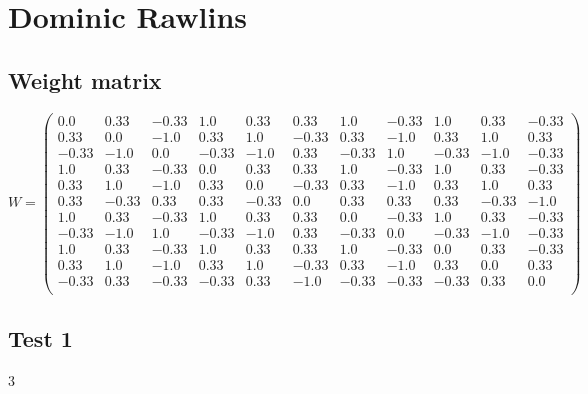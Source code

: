 \documentclass[a4paper,fontsize=12pt]{scrartcl}
\begin{document}
\section*{Dominic Rawlins}
\subsection*{Weight matrix}
$$ W=\left(\begin{array}{ccccccccccc}
0.0&0.33&-0.33&1.0&0.33&0.33&1.0&-0.33&1.0&0.33&-0.33\\0.33&0.0&-1.0&0.33&1.0&-0.33&0.33&-1.0&0.33&1.0&0.33\\-0.33&-1.0&0.0&-0.33&-1.0&0.33&-0.33&1.0&-0.33&-1.0&-0.33\\1.0&0.33&-0.33&0.0&0.33&0.33&1.0&-0.33&1.0&0.33&-0.33\\0.33&1.0&-1.0&0.33&0.0&-0.33&0.33&-1.0&0.33&1.0&0.33\\0.33&-0.33&0.33&0.33&-0.33&0.0&0.33&0.33&0.33&-0.33&-1.0\\1.0&0.33&-0.33&1.0&0.33&0.33&0.0&-0.33&1.0&0.33&-0.33\\-0.33&-1.0&1.0&-0.33&-1.0&0.33&-0.33&0.0&-0.33&-1.0&-0.33\\1.0&0.33&-0.33&1.0&0.33&0.33&1.0&-0.33&0.0&0.33&-0.33\\0.33&1.0&-1.0&0.33&1.0&-0.33&0.33&-1.0&0.33&0.0&0.33\\-0.33&0.33&-0.33&-0.33&0.33&-1.0&-0.33&-0.33&-0.33&0.33&0.0\\\end{array}\right)$$
\subsection*{Test 1}
3
 \qquad
 \qquad
 \qquad
\end{document}
